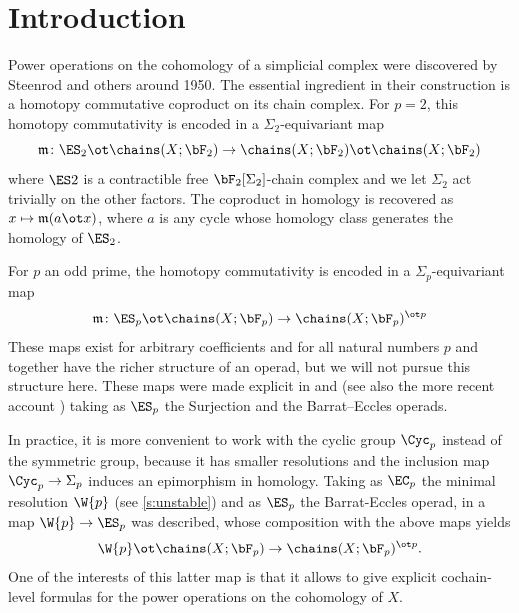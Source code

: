 
\section{Introduction}\label{s:introduction}

Power operations on the cohomology of a simplicial complex were discovered by Steenrod and others around 1950. The essential ingredient in their construction is a homotopy commutative coproduct on its chain complex. For $p=2$, this homotopy commutativity is encoded in a $\Sigma_2$-equivariant map
\begin{equation}\label{eq:st2}
	\mathfrak{m}\colon \ES_2\ot \chains(X;\bF_2)\to \chains(X;\bF_2)\ot \chains(X;\bF_2)
\end{equation}
where $\ES2$ is a contractible free $\bF_2[\Sigma_2]$-chain complex and we let $\Sigma_2$ act trivially on the other factors. The coproduct in homology is recovered as $x\mapsto \mathfrak{m}(a\ot x)$, where $a$ is any cycle whose homology class generates the homology of $\ES_2$.

For $p$ an odd prime, the homotopy commutativity is encoded in a $\Sigma_p$-equivariant map
\begin{equation}\label{eq:stp}
	\mathfrak{m}\colon \ES_p\ot \chains(X;\bF_p)\to \chains(X;\bF_p)^{\ot p}
\end{equation}
These maps exist for arbitrary coefficients and for all natural numbers $p$ and together have the richer structure of an operad, but we will not pursue this structure here. These maps were made explicit in \cite{mcclure2003multivariable} and \cite{berger2004combinatorial} (see also the more recent account \cite{brumfiel2023explicit}) taking as $\ES_p$ the Surjection and the Barrat--Eccles operads. 

In practice, it is more convenient to work with the cyclic group $\Cyc_p$ instead of the symmetric group, because it has smaller resolutions and the inclusion map $\Cyc_p\to \Sigma_p$ induces an epimorphism in homology. Taking as $\EC_p$ the minimal resolution $\W{p}$ (see \cref{s:unstable}) and as $\ES_p$ the Barrat-Eccles operad, in \cite{medina2021may_st} a map $\W{p}\to \ES_p$ was described, whose composition with the above maps yields
\[
	\W{p}\ot \chains(X;\bF_p)\to \chains(X;\bF_p)^{\ot p}.
\]
One of the interests of this latter map is that it allows to give explicit cochain-level formulas for the power operations on the cohomology of $X$.
 
